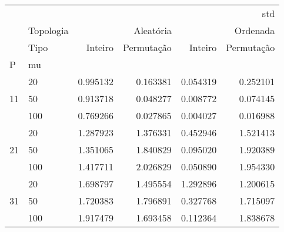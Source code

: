 \begin{tabular}{llrrrr}
\toprule
 &  & \multicolumn{4}{r}{std} \\
 & Topologia & \multicolumn{2}{r}{Aleatória} & \multicolumn{2}{r}{Ordenada} \\
 & Tipo & Inteiro & Permutação & Inteiro & Permutação \\
P & mu &  &  &  &  \\
\midrule
\multirow[t]{3}{*}{11} & 20 & 0.995132 & 0.163381 & 0.054319 & 0.252101 \\
 & 50 & 0.913718 & 0.048277 & 0.008772 & 0.074145 \\
 & 100 & 0.769266 & 0.027865 & 0.004027 & 0.016988 \\
\cline{1-6}
\multirow[t]{3}{*}{21} & 20 & 1.287923 & 1.376331 & 0.452946 & 1.521413 \\
 & 50 & 1.351065 & 1.840829 & 0.095020 & 1.920389 \\
 & 100 & 1.417711 & 2.026829 & 0.050890 & 1.954330 \\
\cline{1-6}
\multirow[t]{3}{*}{31} & 20 & 1.698797 & 1.495554 & 1.292896 & 1.200615 \\
 & 50 & 1.720383 & 1.796891 & 0.327768 & 1.715097 \\
 & 100 & 1.917479 & 1.693458 & 0.112364 & 1.838678 \\
\cline{1-6}
\bottomrule
\end{tabular}

